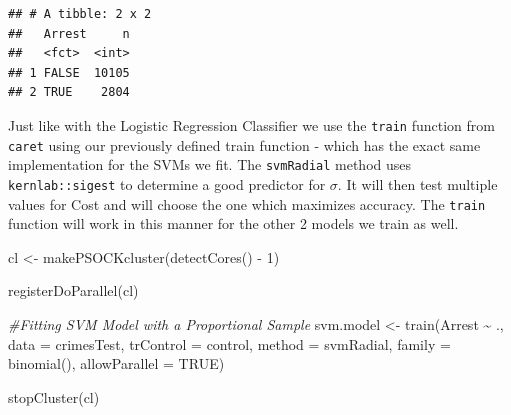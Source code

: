 \documentclass[
]{article}
\newenvironment{Shaded}{\begin{snugshade}}{\end{snugshade}}
\newcommand{\AttributeTok}[1]{\textcolor[rgb]{0.77,0.63,0.00}{#1}}
\newcommand{\CommentTok}[1]{\textcolor[rgb]{0.56,0.35,0.01}{\textit{#1}}}
\newcommand{\ConstantTok}[1]{\textcolor[rgb]{0.00,0.00,0.00}{#1}}
\newcommand{\DecValTok}[1]{\textcolor[rgb]{0.00,0.00,0.81}{#1}}
\newcommand{\FunctionTok}[1]{\textcolor[rgb]{0.00,0.00,0.00}{#1}}
\newcommand{\NormalTok}[1]{#1}
\newcommand{\OtherTok}[1]{\textcolor[rgb]{0.56,0.35,0.01}{#1}}
\newcommand{\SpecialCharTok}[1]{\textcolor[rgb]{0.00,0.00,0.00}{#1}}
\newcommand{\StringTok}[1]{\textcolor[rgb]{0.31,0.60,0.02}{#1}}
\begin{document}
\begin{Shaded}
\end{Shaded}

\begin{verbatim}
## # A tibble: 2 x 2
##   Arrest     n
##   <fct>  <int>
## 1 FALSE  10105
## 2 TRUE    2804
\end{verbatim}

Just like with the Logistic Regression Classifier we use the
\texttt{train} function from \texttt{caret} using our previously defined
train function - which has the exact same implementation for the SVMs we
fit. The \texttt{svmRadial} method uses \texttt{kernlab::sigest} to
determine a good predictor for \(\sigma\). It will then test multiple
values for Cost and will choose the one which maximizes accuracy. The
\texttt{train} function will work in this manner for the other 2 models
we train as well.

\begin{Shaded}
\begin{Highlighting}[]
\NormalTok{cl }\OtherTok{\textless{}{-}} \FunctionTok{makePSOCKcluster}\NormalTok{(}\FunctionTok{detectCores}\NormalTok{() }\SpecialCharTok{{-}} \DecValTok{1}\NormalTok{)}

\FunctionTok{registerDoParallel}\NormalTok{(cl)}

\CommentTok{\#Fitting SVM Model with a Proportional Sample}
\NormalTok{svm.model }\OtherTok{\textless{}{-}} \FunctionTok{train}\NormalTok{(Arrest }\SpecialCharTok{\textasciitilde{}}\NormalTok{ .,}
                   \AttributeTok{data =}\NormalTok{ crimesTest,}
                   \AttributeTok{trControl =}\NormalTok{ control,}
                   \AttributeTok{method =} \StringTok{\textquotesingle{}svmRadial\textquotesingle{}}\NormalTok{,}
                   \AttributeTok{family =} \FunctionTok{binomial}\NormalTok{(),}
                   \AttributeTok{allowParallel =} \ConstantTok{TRUE}\NormalTok{)}

\FunctionTok{stopCluster}\NormalTok{(cl)}
\end{Highlighting}
\end{Shaded}
\end{document}

